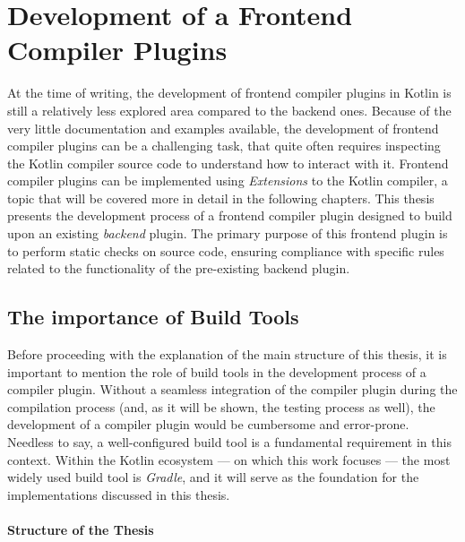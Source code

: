 \documentclass[12pt,a4paper,openright,twoside]{book}
\begin{document}
\section{Development of a Frontend Compiler Plugins}

At the time of writing, the development of frontend compiler plugins in Kotlin is
still a relatively less explored area compared to the backend ones. Because of the 
very little documentation and examples available, the development of frontend 
compiler plugins can be a challenging task, that quite often requires inspecting 
the Kotlin compiler source code to understand how to interact with it.
%
Frontend compiler plugins can be implemented using \textit{Extensions} to the
Kotlin compiler, a topic that will be covered more in detail in the following
chapters. This thesis presents the development process of a frontend compiler
plugin designed to build upon an existing \textit{backend} plugin. The primary
purpose of this frontend plugin is to perform static checks on source code,
ensuring compliance with specific rules related to the functionality of the
pre-existing backend plugin.

\subsection{The importance of Build Tools}

Before proceeding with the explanation of the main structure of this thesis, it
is important to mention the role of build tools in the development process of a
compiler plugin. Without a seamless integration of the compiler plugin during
the compilation process (and, as it will be shown, the testing process as well), the
development of a compiler plugin would be cumbersome and error-prone. 
%
Needless to say, a well-configured build tool is a fundamental requirement in
this context. Within the Kotlin ecosystem — on which this work focuses — the most
widely used build tool is \emph{Gradle}, and it will serve as the foundation for
the implementations discussed in this thesis.

\paragraph{Structure of the Thesis}
\end{document}
